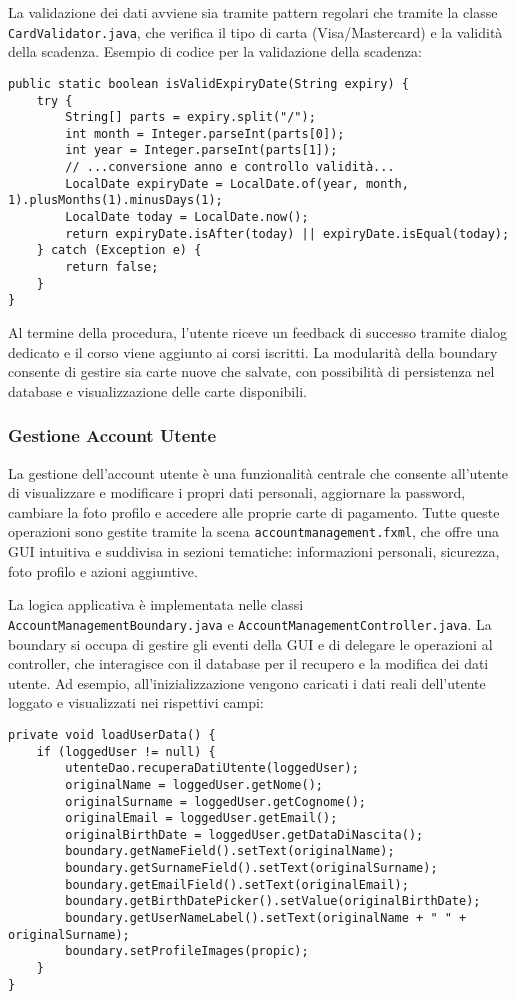 La validazione dei dati avviene sia tramite pattern regolari che tramite la classe \texttt{CardValidator.java}, che verifica il tipo di carta (Visa/Mastercard) e la validità della scadenza. Esempio di codice per la validazione della scadenza:
\begin{verbatim}
public static boolean isValidExpiryDate(String expiry) {
    try {
        String[] parts = expiry.split("/");
        int month = Integer.parseInt(parts[0]);
        int year = Integer.parseInt(parts[1]);
        // ...conversione anno e controllo validità...
        LocalDate expiryDate = LocalDate.of(year, month, 1).plusMonths(1).minusDays(1);
        LocalDate today = LocalDate.now();
        return expiryDate.isAfter(today) || expiryDate.isEqual(today);
    } catch (Exception e) {
        return false;
    }
}
\end{verbatim}
Al termine della procedura, l'utente riceve un feedback di successo tramite dialog dedicato e il corso viene aggiunto ai corsi iscritti. La modularità della boundary consente di gestire sia carte nuove che salvate, con possibilità di persistenza nel database e visualizzazione delle carte disponibili.

\subsubsection{Gestione Account Utente}

La gestione dell'account utente è una funzionalità centrale che consente all'utente di visualizzare e modificare i propri dati personali, aggiornare la password, cambiare la foto profilo e accedere alle proprie carte di pagamento. Tutte queste operazioni sono gestite tramite la scena \texttt{accountmanagement.fxml}, che offre una GUI intuitiva e suddivisa in sezioni tematiche: informazioni personali, sicurezza, foto profilo e azioni aggiuntive.

La logica applicativa è implementata nelle classi \texttt{AccountManagementBoundary.java} e \texttt{AccountManagementController.java}. La boundary si occupa di gestire gli eventi della GUI e di delegare le operazioni al controller, che interagisce con il database per il recupero e la modifica dei dati utente. Ad esempio, all'inizializzazione vengono caricati i dati reali dell'utente loggato e visualizzati nei rispettivi campi:
\begin{verbatim}
private void loadUserData() {
    if (loggedUser != null) {
        utenteDao.recuperaDatiUtente(loggedUser);
        originalName = loggedUser.getNome();
        originalSurname = loggedUser.getCognome();
        originalEmail = loggedUser.getEmail();
        originalBirthDate = loggedUser.getDataDiNascita();
        boundary.getNameField().setText(originalName);
        boundary.getSurnameField().setText(originalSurname);
        boundary.getEmailField().setText(originalEmail);
        boundary.getBirthDatePicker().setValue(originalBirthDate);
        boundary.getUserNameLabel().setText(originalName + " " + originalSurname);
        boundary.setProfileImages(propic);
    }
}
\end{verbatim}

